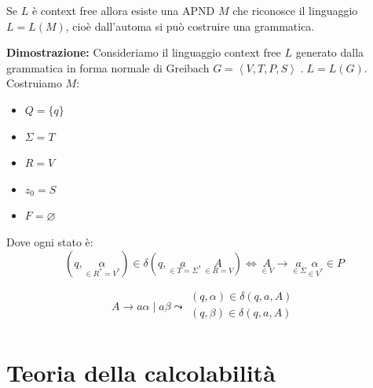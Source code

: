 \documentclass[a4paper]{article}
\begin{document}
\begin{theorem}
  Se \( L \) è context free allora esiste una APND \( M \) che riconosce il linguaggio
  \( L = L(M) \), cioè dall'automa si può costruire una grammatica.

  \vspace{1em}
  \noindent
  \textbf{Dimostrazione:} Consideriamo il linguaggio context free \( L \) generato
  dalla grammatica in forma normale di Greibach
  \( G = \left< V, T, P, S \right> \;.\; L = L(G) \). Costruiamo \( M \):
  \begin{itemize}
    \item \( Q = \{q\}  \) 
    \item \( \Sigma = T \) 
    \item \( R = V \) 
    \item \( z_0 = S \) 
    \item \( F = \varnothing \) 
  \end{itemize}
  Dove ogni stato è:
  \[
    \left( q, \underset{\in  R^* = V^*}{\alpha} \right) \in \delta
    \left( q, \underset{\in  T = \Sigma }{a}, \underset{\in R = V}{A} \right) 
    \iff
    \underset{\in V}{A} \to \underset{\in \Sigma}{a} \underset{\in V^*}{\alpha} \in P
  \]
  \begin{example}
    \[
      A \to a \alpha \;|\; a \beta \leadsto 
      \begin{aligned}
        \left( q, \alpha \right) \in \delta \left( q, a, A \right) \\
        \left( q, \beta \right) \in \delta \left( q, a, A \right) \\
      \end{aligned}
    \] 
  \end{example}
\end{theorem}


\section{Teoria della calcolabilità}
\end{document}

